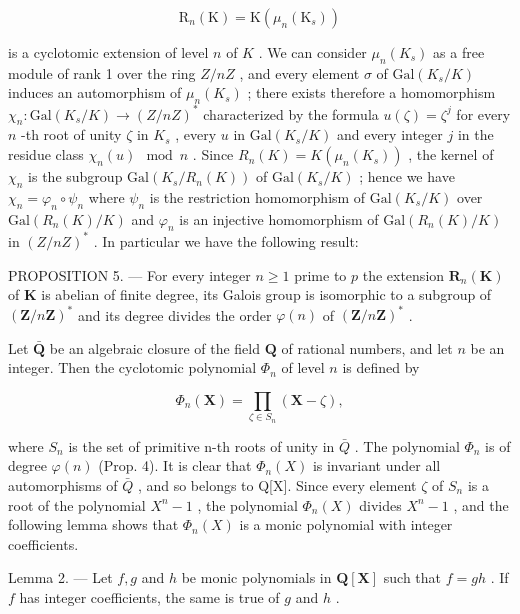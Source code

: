 \[
\mathrm{R} _ {n} (\mathrm{K}) = \mathrm{K} \left(\mu_ {n} \left(\mathrm{K} _ {s}\right)\right)
\]

is a cyclotomic extension of level \(n\) of \(K\) . We can consider \(\mu_n(K_s)\) as a free module of rank 1 over the ring \(Z/nZ\) , and every element \(\sigma\) of \(\text{Gal}(K_s/K)\) induces an automorphism of \(\mu_n(K_s)\) ; there exists therefore a homomorphism \(\chi_n: \text{Gal}(K_s/K) \to (Z/nZ)^*\) characterized by the formula \(u(\zeta) = \zeta^j\) for every \(n\) -th root of unity \(\zeta\) in \(K_s\) , every \(u\) in \(\text{Gal}(K_s/K)\) and every integer \(j\) in the residue class \(\chi_n(u) \mod n\) . Since \(R_n(K) = K(\mu_n(K_s))\) , the kernel of \(\chi_n\) is the subgroup \(\text{Gal}(K_s/R_n(K))\) of \(\text{Gal}(K_s/K)\) ; hence we have \(\chi_n = \varphi_n \circ \psi_n\) where \(\psi_n\) is the restriction homomorphism of \(\text{Gal}(K_s/K)\) over \(\text{Gal}(R_n(K)/K)\) and \(\varphi_n\) is an injective homomorphism of \(\text{Gal}(R_n(K)/K)\) in \((Z/nZ)^*\) . In particular we have the following result:

PROPOSITION 5. --- For every integer \(n \geqslant 1\) prime to \(p\) the extension \(\mathbf{R}_n(\mathbf{K})\) of \(\mathbf{K}\) is abelian of finite degree, its Galois group is isomorphic to a subgroup of \((\mathbf{Z}/n\mathbf{Z})^*\) and its degree divides the order \(\varphi(n)\) of \((\mathbf{Z}/n\mathbf{Z})^*\) .

Let \(\bar{\mathbf{Q}}\) be an algebraic closure of the field \(\mathbf{Q}\) of rational numbers, and let \(n\) be an integer. Then the cyclotomic polynomial \(\Phi_n\) of level \(n\) is defined by

\[
\Phi_ {n} (\mathbf {X}) = \prod_ {\zeta \in S _ {n}} \left(\mathbf {X} - \zeta\right),\tag{5}
\]

where \(S_{n}\) is the set of primitive n-th roots of unity in \(\bar{Q}\) . The polynomial \(\Phi_{n}\) is of degree \(\varphi(n)\) (Prop. 4). It is clear that \(\Phi_{n}(X)\) is invariant under all automorphisms of \(\bar{Q}\) , and so belongs to Q{[}X{]}. Since every element \(\zeta\) of \(S_{n}\) is a root of the polynomial \(X^{n}-1\) , the polynomial \(\Phi_{n}(X)\) divides \(X^{n}-1\) , and the following lemma shows that \(\Phi_{n}(X)\) is a monic polynomial with integer coefficients.

Lemma 2. --- Let \(f, g\) and \(h\) be monic polynomials in \(\mathbf{Q}[\mathbf{X}]\) such that \(f = gh\) . If \(f\) has integer coefficients, the same is true of \(g\) and \(h\) .

